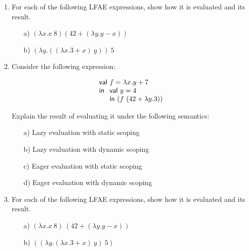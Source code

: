 \begin{enumerate}
\item For each of the following LFAE expressions, show how it is evaluated and its result.

\begin{itemize}
  \item[a)] \((\lambda x.x\ 8) (42 + (\lambda y.y - x)) \)
  \item[b)] \((\lambda y.((\lambda x.3 + x)\ y))\ 5\)
\end{itemize}

\item Consider the following expression:

\[
\begin{array}{l@{~}l}
\textsf{val}& f = \lambda x. y + 7\\
\textsf{in}& \textsf{val}\ y = 4\\
& \textsf{in}\ (f\ (42 + \lambda y.3))
\end{array}
\]

Explain the result of evaluating it under the following semantics:
\begin{itemize}
  \item[a)] Lazy evaluation with static scoping%
  \item[b)] Lazy evaluation with dynamic scoping%
  \item[c)] Eager evaluation with static scoping%
  \item[d)] Eager evaluation with dynamic scoping%
\end{itemize}

\item For each of the following LFAE expressions, show how it is evaluated and its result.

\begin{itemize}
  \item[a)] \((\lambda x.x\ 8)\ (42 + (\lambda y. y - x))\)

  \item[b)] \(((\lambda y. (\lambda x.3 + x)\ y)\ 5)\)
\end{itemize}


\end{enumerate}
